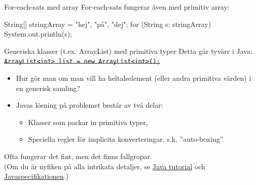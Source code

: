 \begin{Slide}{For-each-sats med array}
For-each-sats fungerar även med primitiv array:
\begin{Code}[numberstyle=,language=Java]
        String[] stringArray = {"hej", "på", "dej"};
        for (String s: stringArray) {
            System.out.println(s);
        }
\end{Code}
\end{Slide}








\begin{Slide}{Generiska klasser (t.ex. ArrayList) med primitiva typer}
Detta går tyvärr  i Java: \\
  \sout{\texttt{ArrayList<int> list = new ArrayList<int>();}}
  
\pause
\begin{itemize}\SlideFontSmall
\item Hur gör man om man vill ha heltalselement (eller andra primitiva värden) i en generisk samling?

\item Javas lösning på problemet består av två delar:
\begin{itemize}\SlideFontSmall
\item Klasser som packar in primitiva typer, 
\item Speciella regler för implicita konverteringar, s.k. ''auto-boxing'' 
\end{itemize}
\end{itemize}
\SlideFontTiny\vspace{1em}
Ofta fungerar det fint, men det finns fallgropar.\\
(Om du är nyfiken på alla intrikata detaljer, se
\href{https://docs.oracle.com/javase/tutorial/java/data/autoboxing.html}{Java tutorial} och   \href{https://docs.oracle.com/javase/specs/jls/se8/html/jls-5.html#jls-5.1.7}{Javaspecifikationen}.)
\end{Slide}

